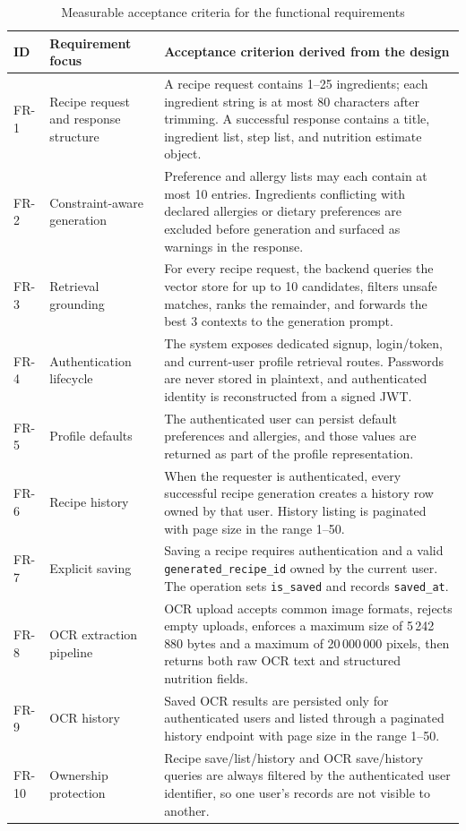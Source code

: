 \begin{table}[H]
	\centering
	\scriptsize
	\begin{tabular}{|p{1.4cm}|p{5.7cm}|p{7.2cm}|}
		\hline
		\textbf{ID} & \textbf{Requirement focus} & \textbf{Acceptance criterion derived from the design} \\
		\hline
		FR-1 & Recipe request and response structure & A recipe request contains 1--25 ingredients; each ingredient string is at most 80 characters after trimming. A successful response contains a title, ingredient list, step list, and nutrition estimate object. \\
		\hline
		FR-2 & Constraint-aware generation & Preference and allergy lists may each contain at most 10 entries. Ingredients conflicting with declared allergies or dietary preferences are excluded before generation and surfaced as warnings in the response. \\
		\hline
		FR-3 & Retrieval grounding & For every recipe request, the backend queries the vector store for up to 10 candidates, filters unsafe matches, ranks the remainder, and forwards the best 3 contexts to the generation prompt. \\
		\hline
		FR-4 & Authentication lifecycle & The system exposes dedicated signup, login/token, and current-user profile retrieval routes. Passwords are never stored in plaintext, and authenticated identity is reconstructed from a signed JWT. \\
		\hline
		FR-5 & Profile defaults & The authenticated user can persist default preferences and allergies, and those values are returned as part of the profile representation. \\
		\hline
		FR-6 & Recipe history & When the requester is authenticated, every successful recipe generation creates a history row owned by that user. History listing is paginated with page size in the range 1--50. \\
		\hline
		FR-7 & Explicit saving & Saving a recipe requires authentication and a valid \texttt{generated\_recipe\_id} owned by the current user. The operation sets \texttt{is\_saved} and records \texttt{saved\_at}. \\
		\hline
		FR-8 & OCR extraction pipeline & OCR upload accepts common image formats, rejects empty uploads, enforces a maximum size of 5\,242\,880 bytes and a maximum of 20\,000\,000 pixels, then returns both raw OCR text and structured nutrition fields. \\
		\hline
		FR-9 & OCR history & Saved OCR results are persisted only for authenticated users and listed through a paginated history endpoint with page size in the range 1--50. \\
		\hline
		FR-10 & Ownership protection & Recipe save/list/history and OCR save/history queries are always filtered by the authenticated user identifier, so one user's records are not visible to another. \\
		\hline
	\end{tabular}
	\caption{Measurable acceptance criteria for the functional requirements}
	\label{tab:design-fr-criteria}
\end{table}

